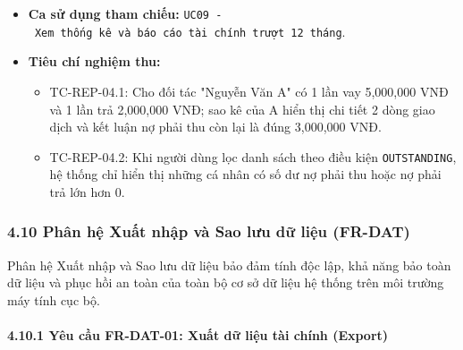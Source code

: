 \documentclass[11pt,a4paper]{article}
\providecommand{\tightlist}{
  \setlength{\itemsep}{0pt}\setlength{\parskip}{0pt}}
\begin{document}
\begin{itemize}
  \begin{itemize}
  \tightlist
  \item
    Bảng sao kê công nợ chi tiết gồm: Ngày phát sinh, Loại nghiệp vụ, Số
    tiền, Ví liên kết, Ghi chú, Dư nợ lũy kế sau giao dịch.
  \item
    Bảng tổng kết số dư nợ hiện tại với đối tượng.
  \end{itemize}
\item
  \textbf{Ca sử dụng tham chiếu:}
  \texttt{UC09\ -\ Xem\ thống\ kê\ và\ báo\ cáo\ tài\ chính\ trượt\ 12\ tháng}.
\item
  \textbf{Tiêu chí nghiệm thu:}

  \begin{itemize}
  \tightlist
  \item
    TC-REP-04.1: Cho đối tác "Nguyễn Văn A" có 1 lần vay 5,000,000 VNĐ
    và 1 lần trả 2,000,000 VNĐ; sao kê của A hiển thị chi tiết 2 dòng
    giao dịch và kết luận nợ phải thu còn lại là đúng 3,000,000 VNĐ.
  \item
    TC-REP-04.2: Khi người dùng lọc danh sách theo điều kiện
    \texttt{OUTSTANDING}, hệ thống chỉ hiển thị những cá nhân có số dư
    nợ phải thu hoặc nợ phải trả lớn hơn 0.
  \end{itemize}
\end{itemize}

\subsubsection{4.10 Phân hệ Xuất nhập và Sao lưu dữ liệu
(FR-DAT)}\label{410-phuxe2n-hux1ec7-xuux1ea5t-nhux1eadp-vuxe0-sao-lux1b0u-dux1eef-liux1ec7u-fr-dat}

Phân hệ Xuất nhập và Sao lưu dữ liệu bảo đảm tính độc lập, khả năng bảo
toàn dữ liệu và phục hồi an toàn của toàn bộ cơ sở dữ liệu hệ thống trên
môi trường máy tính cục bộ.

\paragraph{4.10.1 Yêu cầu FR-DAT-01: Xuất dữ liệu tài chính
(Export)}\label{4101-yuxeau-cux1ea7u-fr-dat-01-xuux1ea5t-dux1eef-liux1ec7u-tuxe0i-chuxednh-export}
\end{document}
